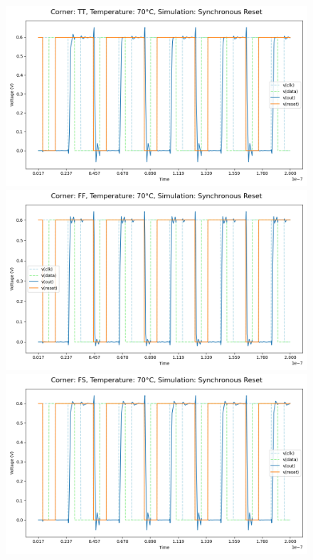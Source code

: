 \begin{figure}[H]
    \centering
    \includegraphics[height= 0.21\textheight]{figures/aimspice/TT/70/W4.csv.png}
    \vspace{5pt}
    \includegraphics[height= 0.21\textheight]{figures/aimspice/FF/70/W4.csv.png}
    \vspace{5pt}
    \includegraphics[height= 0.21\textheight]{figures/aimspice/FS/70/W4.csv.png}

\end{figure}
